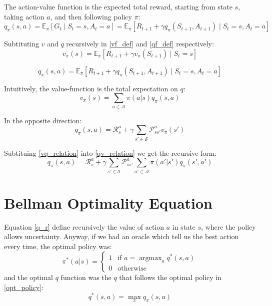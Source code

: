 \documentclass[10pt,a4paper,draft]{article}
\DeclareMathOperator*{\argmax}{argmax}
\begin{document}
The action-value function is the expected total reward, starting from state $s$, taking action $a$, and then following policy $\pi$:
\begin{equation}
q_{\pi}(s,a) = \mathbb{E}_{\pi}[G_t \mid S_t = s, A_t = a] = \mathbb{E}_{\pi}[R_{t+1} + \gamma q_{\pi}(S_{t+1},A_{t+1}) \mid S_t = s, A_t = a]
\label{qf_def}
\end{equation}

Subtituting $v$ and $q$ recursively in \eqref{vf_def} and \eqref{qf_def} respectively:
\begin{equation}
v_{\pi}(s) =\mathbb{E}_{\pi}[R_{t+1} + \gamma v_{\pi}(S_{t+1}) \mid S_t = s]
\label{vf_r_def}
\end{equation}

\begin{equation}
q_{\pi}(s,a) = \mathbb{E}_{\pi}[R_{t+1} + \gamma q_{\pi}(S_{t+1},A_{t+1}) \mid S_t = s, A_t = a]
\label{qf_r_def}
\end{equation}

Intuitively, the value-function is the total expectation on $q$:
\begin{equation}
v_{\pi}(s) = \sum_{a \in \mathcal{A}} \pi(a|s)q_{\pi}(s,a)
\label{vq_relation}
\end{equation}

In the opposite direction:
\begin{equation}
q_{\pi}(s,a) = \mathcal{R}_s^a + \gamma\sum_{s' \in \mathcal{S}} \mathcal{P}_{ss'}^a v_{\pi}(s')
\label{qv_relation}
\end{equation}

Subtituing \eqref{vq_relation} into \eqref{qv_relation} we get the recursive  form:
\begin{equation}
q_{\pi}(s,a) = \mathcal{R}_s^a + \gamma\sum_{s' \in \mathcal{S}} \mathcal{P}_{ss'}^a \sum_{a' \in \mathcal{A}} \pi(a'|s')q_{\pi}(s',a')
\label{q_r}
\end{equation}

\section{Bellman Optimality Equation}
Equation \eqref{q_r} define recursively the value of action $a$ in state $s$, where the policy allows uncertainty.
Anyway, if we had an oracle which tell us the best action every time, the optimal policy was:
\begin{equation}
\pi^*(a|s) = 	
	\begin{cases} 
		1 & \text{if } a = \argmax_a q^*(s,a) \\ 
		0 & \text{otherwise}
	\end{cases}
\label{opt_policy}
\end{equation}
and the optimal $q$ function was the $q$ that follows the optimal policy in \eqref{opt_policy}:
\begin{equation}
q^*(s,a) = \max_{\pi} q_{\pi}(s,a)
\label{opt_q}
\end{equation}
\end{document}
